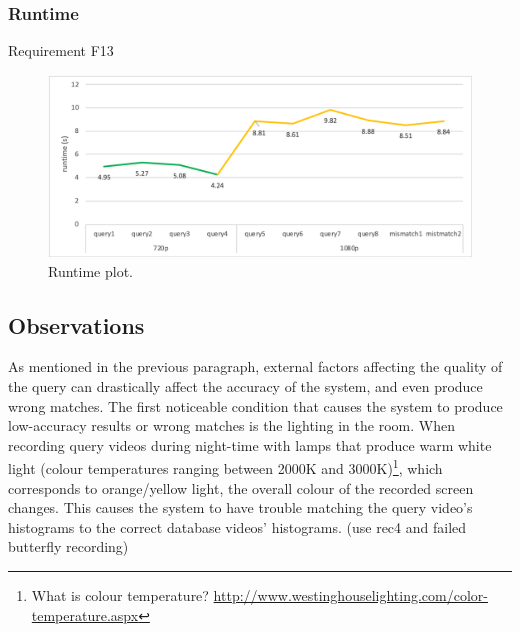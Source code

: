 \subsubsection{Runtime}

Requirement F13

\begin{figure}[h] 
\centerline{\includegraphics[width=\textwidth]{figures/evaluation/runtime_plot.png}}
\caption{\label{fig:evaluation-runtime_plot}Runtime plot.}
\end{figure}

\subsection{Observations}
\label{sec:evaluation-observations-online-phase}

As mentioned in the previous paragraph, external factors affecting the quality of the query can drastically affect the accuracy of the system, and even produce wrong matches. The first noticeable condition that causes the system to produce low-accuracy results or wrong matches is the lighting in the room. When recording query videos during night-time with lamps that produce warm white light (colour temperatures ranging between 2000K and 3000K)\footnote{What is colour temperature? \url{http://www.westinghouselighting.com/color-temperature.aspx}}, which corresponds to orange/yellow light, the overall colour of the recorded screen changes. This causes the system to have trouble matching the query video's histograms to the correct database videos' histograms. (use rec4 and failed butterfly recording)

